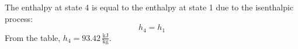 The enthalpy at state 4 is equal to the enthalpy at state 1 due to the isenthalpic process:  
\[
h_4 = h_1
\]  
From the table, \( h_4 = 93.42 \, \frac{\text{kJ}}{\text{kg}} \).
